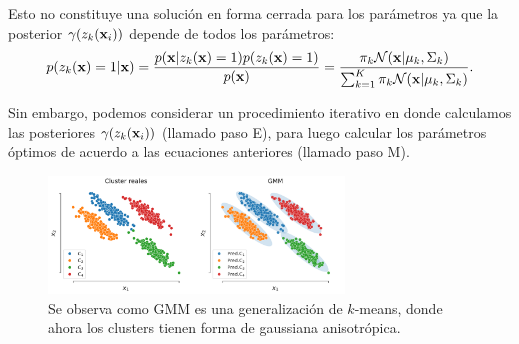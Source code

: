 \documentclass[handout, 9pt]{beamer}
\begin{document}
\begin{frame}
Esto no constituye una solución en forma cerrada para los parámetros ya que la posterior $\gamma(z_k(\mathbf{x}_i))$ depende de todos los parámetros:
\begin{align*}
	p(z_k(\mathbf{x})=1|\mathbf{x}) = \frac{p(\mathbf{x}|z_k(\mathbf{x})=1)p(z_k(\mathbf{x})=1)}{p(\mathbf{x})} = \frac{\pi_k {\mathcal N}(\mathbf{x}|\mu_k,\Sigma_k)}{\sum_{k=1}^K \pi_k {\mathcal N}(\mathbf{x}|\mu_k,\Sigma_k)} .
\end{align*} 
\pause

Sin embargo, podemos considerar un procedimiento iterativo en donde calculamos las posteriores $\gamma(z_k(\mathbf{x}_i))$ (llamado paso E), para luego calcular los parámetros óptimos de acuerdo a las ecuaciones anteriores (llamado paso M). \pause

\begin{figure}[ht]
  \centering
  \includegraphics[width=0.7\textwidth]{../img/cap6_gmm}
  \caption{Se observa como GMM es una generalización de $k$-means, donde ahora los clusters tienen forma de gaussiana anisotrópica.}
  \label{fig:gmm}
\end{figure}

\end{frame}
\end{document}
